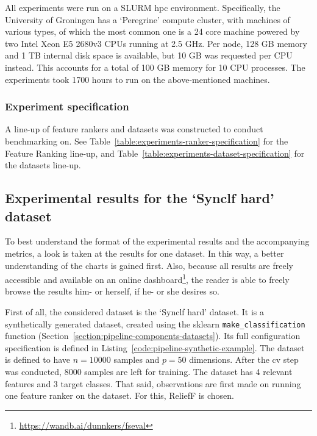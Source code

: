 \documentclass[../main.tex]{subfiles}
\begin{document}
All experiments were run on a SLURM \gls{hpc} environment. Specifically, the University of Groningen has a `Peregrine' compute cluster, with machines of various types, of which the most common one is a 24 core machine powered by two Intel Xeon E5 2680v3 CPUs running at 2.5 GHz. Per node, 128 GB memory and 1 TB internal disk space is available, but 10 GB was requested per CPU instead. This accounts for a total of 100 GB memory for 10 CPU processes. The experiments took  1700 hours to run on the above-mentioned machines.



\subsubsection{Experiment specification}
A line-up of feature rankers and datasets was constructed to conduct benchmarking on. See  Table~\ref{table:experiments-ranker-specification} for the Feature Ranking line-up, and Table~\ref{table:experiments-dataset-specification} for the datasets line-up.






\subsection{Experimental results for the `Synclf hard' dataset}\label{section:experiments-example}
To best understand the format of the experimental results and the accompanying metrics, a look is taken at the results for one dataset. In this way, a better understanding of the charts is gained first. Also, because all results are freely accessible and available on an online dashboard\footnote{\href{https://wandb.ai/dunnkers/fseval}{https://wandb.ai/dunnkers/fseval}}, the reader is able to freely browse the results him- or herself, if he- or she desires so.

First of all, the considered dataset is the `Synclf hard' dataset. It is a synthetically generated dataset, created using the sklearn \texttt{make\_classification} function (Section~\ref{section:pipeline-components-datasets}). Its full configuration specification is defined in Listing~\ref{code:pipeline-synthetic-example}. The dataset is defined to have $n=10000$ samples and $p=50$ dimensions. After the \gls{cv} step was conducted, 8000 samples are left for training. The dataset has 4 relevant features and 3 target classes. That said, observations are first made on running one feature ranker on the dataset. For this, ReliefF \citep{kononenko_estimating_1994} is chosen.
\end{document}
